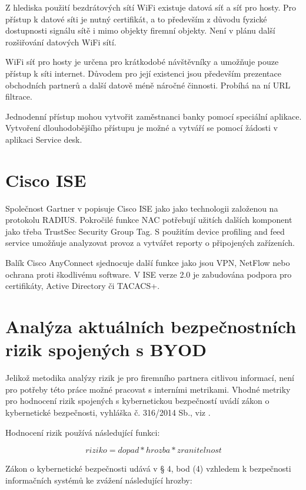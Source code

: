 Z hlediska použití bezdrátových sítí WiFi existuje datová síť a síť pro hosty. Pro přístup k datové síti je nutný certifikát, a to především z důvodu fyzické dostupnosti signálu sítě i mimo objekty firemní objekty. Není v plánu další rozšiřování datových WiFi sítí.  

WiFi síť pro hosty je určena pro krátkodobé návštěvníky a umožňuje pouze přístup k síti internet. Důvodem pro její existenci jsou především prezentace obchodních partnerů a další datově méně náročné činnosti. Probíhá na ní URL filtrace.

Jednodenní přístup mohou vytvořit zaměstnanci banky pomocí speciální aplikace. Vytvoření dlouhodobějšího přístupu je možné a vytváří se pomocí žádosti v aplikaci Service desk. 

\section{Cisco ISE}
Společnost Gartner v \cite{GartnerNAC} popisuje Cisco ISE jako jako technologii založenou na protokolu RADIUS. Pokročilé funkce NAC potřebují užitích dalších komponent jako třeba TrustSec Security Group Tag. S použitím device profiling and feed service umožňuje analyzovat provoz a vytvářet reporty o připojených zařízeních.

Balík Cisco AnyConnect sjednocuje další funkce jako jsou VPN, NetFlow nebo ochrana proti škodlivému software. V ISE verze 2.0 je zabudována podpora pro certifikáty, Active Directory či TACACS+.

\section{Analýza aktuálních bezpečnostních rizik spojených s BYOD}
Jelikož metodika analýzy rizik je pro firemního partnera citlivou informací, není pro potřeby této práce možné pracovat s interními metrikami. Vhodné metriky pro hodnocení rizik spojených s kybernetickou bezpečností uvádí zákon o kybernetické bezpečnosti, vyhláška č. 316/2014 Sb., viz \cite{Zakon1}.

Hodnocení rizik používá následující funkci:

$$ riziko = dopad * hrozba * zranitelnost $$


Zákon o kybernetické bezpečnosti udává v § 4, bod (4) vzhledem k bezpečnosti informačních systémů ke zvážení následující hrozby:

